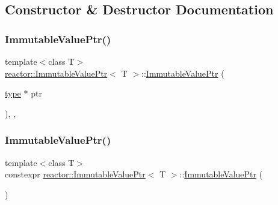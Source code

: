 \subsection{Constructor \& Destructor Documentation}
\mbox{\label{classreactor_1_1ImmutableValuePtr_ae0d6edc13d77e9a68811d200c02fef84}} 
\subsubsection{\texorpdfstring{Immutable\+Value\+Ptr()}{ImmutableValuePtr()}\hspace{0.1cm}{\footnotesize\ttfamily [1/6]}}
{\footnotesize\ttfamily template$<$class T$>$ \\
\hyperlink{classreactor_1_1ImmutableValuePtr}{reactor\+::\+Immutable\+Value\+Ptr}$<$ T $>$\+::\hyperlink{classreactor_1_1ImmutableValuePtr}{Immutable\+Value\+Ptr} (\begin{DoxyParamCaption}\item[{\hyperlink{classreactor_1_1ImmutableValuePtr_a88dbe82ff9b732b87e054ee37254bdfa}{type} $\ast$}]{ptr }\end{DoxyParamCaption})\hspace{0.3cm}{\ttfamily [inline]}, {\ttfamily [explicit]}, {\ttfamily [private]}}

\mbox{\label{classreactor_1_1ImmutableValuePtr_aa7bbdefa52d839dbf71a1b8369754356}} 
\subsubsection{\texorpdfstring{Immutable\+Value\+Ptr()}{ImmutableValuePtr()}\hspace{0.1cm}{\footnotesize\ttfamily [2/6]}}
{\footnotesize\ttfamily template$<$class T$>$ \\
constexpr \hyperlink{classreactor_1_1ImmutableValuePtr}{reactor\+::\+Immutable\+Value\+Ptr}$<$ T $>$\+::\hyperlink{classreactor_1_1ImmutableValuePtr}{Immutable\+Value\+Ptr} (\begin{DoxyParamCaption}{ }\end{DoxyParamCaption})\hspace{0.3cm}{\ttfamily [inline]}}

